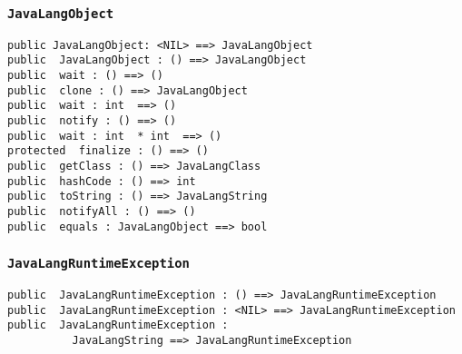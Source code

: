\documentclass[\pformat,12pt]{article}
\begin{document}
\subsubsection{\texttt{JavaLangObject}}
\begin{small}
\begin{verbatim}
public JavaLangObject: <NIL> ==> JavaLangObject
public  JavaLangObject : () ==> JavaLangObject
public  wait : () ==> ()
public  clone : () ==> JavaLangObject
public  wait : int  ==> ()
public  notify : () ==> ()
public  wait : int  * int  ==> ()
protected  finalize : () ==> ()
public  getClass : () ==> JavaLangClass
public  hashCode : () ==> int
public  toString : () ==> JavaLangString
public  notifyAll : () ==> ()
public  equals : JavaLangObject ==> bool
\end{verbatim}
\end{small}

\subsubsection{\texttt{JavaLangRuntimeException}}
\begin{small}
\begin{verbatim}
public  JavaLangRuntimeException : () ==> JavaLangRuntimeException
public  JavaLangRuntimeException : <NIL> ==> JavaLangRuntimeException
public  JavaLangRuntimeException : 
          JavaLangString ==> JavaLangRuntimeException
\end{verbatim}
\end{small}
\end{document}
